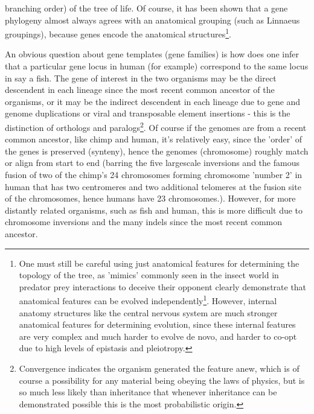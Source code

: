 branching order) of the tree of life.  Of course, it has been shown that a gene phylogeny almost always agrees with an anatomical grouping (such as Linnaeus groupings), because genes encode the anatomical structures\footnote{One must still be careful using just anatomical features for determining the topology of the tree, as 'mimics' commonly seen in the insect world in predator prey interactions to deceive their opponent clearly demonstrate that anatomical features can be evolved independently\footnote{The mimic's anatomical features are independent of the predator or prey at a genetic level, while they are dependent at an organismal level, where the predator or prey provides the selection pressure to evolve (presumably through co-option of existing genes) the gene's that encode the anatomical features.}.  However, internal anatomy structures like the central nervous system are much stronger anatomical features for determining evolution, since these internal features are very complex and much harder to evolve de novo, and harder to co-opt due to high levels of epistasis and pleiotropy.}.

An obvious question about gene templates (gene families) is how does one infer that a particular gene locus in human (for example) correspond to the same locus in say a fish.  The gene of interest in the two organisms may be the direct descendent in each lineage since the most recent common ancestor of the organisms, or it may be the indirect descendent in each lineage due to gene and genome duplications or viral and transposable element insertions - this is the distinction of orthologs and paralogs\footnote{Convergence indicates the organism generated the feature anew, which is of course a possibility for any material being obeying the laws of physics, but is so much less likely than inheritance that whenever inheritance can be demonstrated possible this is the most probabilistic origin.}.  Of course if the genomes are from a recent common ancestor, like chimp and human, it's relatively easy, since the 'order' of the genes is preserved (synteny), hence the genomes (chromosome) roughly match or align from start to end (barring the five largescale inversions and the famous fusion of two of the chimp's 24 chromosomes forming chromosome 'number 2' in human that has two centromeres and two additional telomeres at the fusion site of the chromosomes, hence humans have 23 chromosomes.).  However, for more distantly related organisms, such as fish and human, this is more difficult due to chromosome inversions and the many indels since the most recent common ancestor.  
